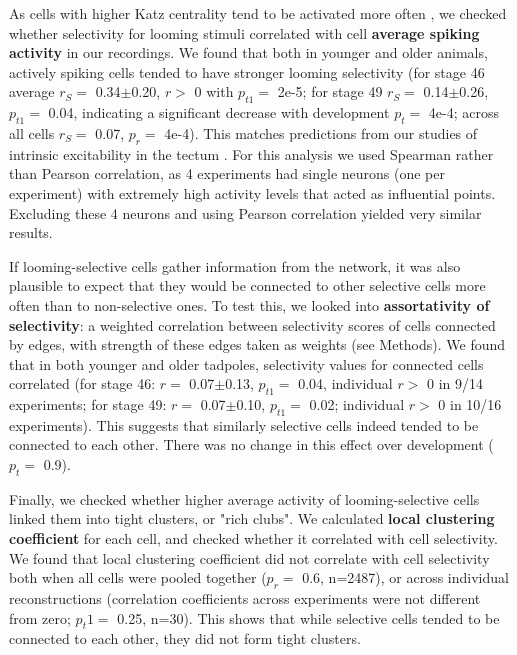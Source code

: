 \documentclass{article}
\begin{document}
As cells with higher Katz centrality tend to be activated more often \citep{fletcher2018katz}, we checked whether selectivity for looming stimuli correlated with cell \textbf{average spiking activity} in our recordings. We found that both in younger and older animals, actively spiking cells tended to have stronger looming selectivity (for stage 46 average $r_S=$ 0.34$\pm$0.20, $r>$ 0 with $p_{t1}=$ 2e-5; for stage 49 $r_S=$ 0.14$\pm$0.26, $p_{t1}=$ 0.04, indicating a significant decrease with development $p_t=$ 4e-4; across all cells $r_S=$ 0.07, $p_r=$ 4e-4). This matches predictions from our studies of intrinsic excitability in the tectum \citep{busch2019}. For this analysis we used Spearman rather than Pearson correlation, as 4 experiments had single neurons (one per experiment) with extremely high activity levels that acted as influential points. Excluding these 4 neurons and using Pearson correlation yielded very similar results.

If looming-selective cells gather information from the network, it was also plausible to expect that they would be connected to other selective cells more often than to non-selective ones. To test this, we looked into \textbf{assortativity of selectivity}: a weighted correlation between selectivity scores of cells connected by edges, with strength of these edges taken as weights (see Methods). We found that in both younger and older tadpoles, selectivity values for connected cells correlated (for stage 46: $r=$ 0.07$\pm$0.13, $p_{t1}=$ 0.04, individual $r>$ 0 in 9/14 experiments; for stage 49: $r=$ 0.07$\pm$0.10, $p_{t1}=$ 0.02; individual $r>$ 0 in 10/16 experiments). This suggests that similarly selective cells indeed tended to be connected to each other. There was no change in this effect over development ($p_t=$ 0.9).


Finally, we checked whether higher average activity of looming-selective cells linked them into tight clusters, or "rich clubs". We calculated \textbf{local clustering coefficient} for each cell, and checked whether it correlated with cell selectivity. We found that local clustering coefficient did not correlate with cell selectivity both when all cells were pooled together ($p_r=$ 0.6, n=2487), or across individual reconstructions (correlation coefficients across experiments were not different from zero; $p_t1=$ 0.25, n=30). This shows that while selective cells tended to be connected to each other, they did not form tight clusters.
\end{document}
